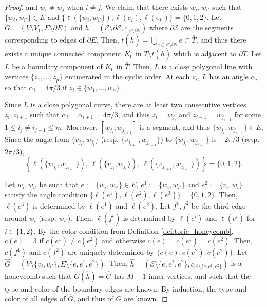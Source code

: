 \documentclass[11pt,a4paper]{amsart}
\numberwithin{equation}{section}
\theoremstyle{definition}
\begin{document}
\begin{proof}
    and $w_i\not =w_j$ when $i\not=j$. We claim that there exists $w_{i},w_{i'}$ such that 
    $\{w_{i},w_{i'}\}\in E$ and $\{\ell(\{w_{i},w_{i'}\}),\ell(e_{i}),\ell(e_{i'})\}=\{0,1,2\}$. 
    Let $\tilde{G}=(V\setminus V_{1},E\setminus \partial E)$ and $\tilde{h}=(\mathcal{E}\setminus \partial \mathcal{E},c_{\vert \mathcal{E}\setminus \partial \mathcal{E}})$ where $\partial \mathcal{E}$ are the segments corresponding to edges of $\partial E$. 
    Then, $t(\tilde{h})=\bigcup_{e\in \mathcal{E}\setminus \partial \mathcal{E}}e \subset \overset{\circ}{T}$, and thus 
    there exists a unique connected component $K_0$ in $T\setminus t(\tilde{h})$ which is adjacent to $\partial T$. 
    Let $L$ be a boundary component of $K_0$ in $\overset{\circ}{T}$. Then, $L$ is a close polygonal line with vertices 
    $\{z_1,\ldots,z_p\}$ enumerated in the cyclic order. 
    At each $z_i$, $L$ has an angle $\alpha_i$ so that $\alpha_i=4\pi/3$ if $z_i\in \{w_1,\ldots,w_n\}$.
    
    
    Since $L$ is a close polygonal curve, there are at least two consecutive vertices 
    $z_i,z_{i+1}$  such that $\alpha_i=\alpha_{i+1}=4\pi/3$, and thus $z_i=w_{j_i}$ and $z_{i+1}=w_{j_{i+1}}$ for some $1\leqslant i_j\not=i_{j+1}\leqslant m$. 
    Moreover, $[w_{j_i},w_{j_{i+1}}]$ is a segment, and thus $\{w_{j_i},w_{j_{i+1}}\}\in E$. 
    Since the angle from $\{v_{j_i},w_{j_i}\}$ (resp. $\{v_{j_{i+1}},w_{j_{i+1}}\}$) to 
    $\{w_{j_i},w_{j_{i+1}}\}$ 
    is $-2\pi/3$ (resp. $2\pi/3$),
    $$\left\{ \ell(\{w_{j_i},w_{j_{i+1}}\}), \ 
    \ell(\{v_{j_i},w_{j_i}\}), \ 
    \ell(\{v_{j_{i+1}},w_{j_{i+1}}\})\right\} = \{0,1,2\}.$$

    \noindent
    Let $w_{i},w_{i'}$ be such that $e:=\{w_{i},w_{i'}\}\in E$, $e^1:=\{w_{i},w_{i'}\}$ 
    and $e^2:=\{v_i,w_i\}$ satisfy the angle condition $\{\ell(e^1),\ell(e^2),\ell(e^3)\} 
    =\{0,1,2\}$. 
    Then, $\ell(e^3)$ is determined by $\ell(e^1)$ and $\ell(e^2)$. 
    Let $f^1,f^2$ be the third edge around $w_i$ (resp. $w_{i'}$). 
    Then, $\ell(f^i)$ is determined by $\ell(e^i)$ and $\ell(e^i)$ for $i \in \{1,2\}$. 
    By the color condition from Definition \ref{def:toric_honeycomb}, 
    $c(e)=3$ if $c(e^1)\not=c(e^2)$ and otherwise $c(e)=c(e^1)=c(e^2)$. 
    Then, $c(f^1)$ and $c(f^2)$ are uniquely determined by $\{c(e), c(e^2),c(e^2)\}$. 
    Let $\hat{G} = \left(V\setminus \{v_i,v_{i'}\},E\setminus \{e,e^1,e^2\}\right)$. 
    Then, $\hat{h}=(\mathcal{E}\setminus \{e, e^1, e^2\},c_{\vert \mathcal{E}\setminus \{e, e^1, e^2\}})$ is a honeycomb such that
    $G(\hat{h}) = \hat{G}$ has $M-1$ inner vertices, and such that the type and color 
    of the boundary edges are known. By induction, the type and color of all edges of $\hat{G}$, 
    and thus of $G$ are known. 
\end{proof}
\end{document}
